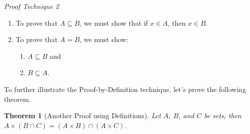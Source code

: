\documentclass[10pt,]{book}
\theoremstyle{plain}
\newtheorem{theorem}{Theorem}[section]
\theoremstyle{definition}
\theoremstyle{definition}
\theoremstyle{definition}
\begin{document}
\par
\emph{Proof Technique 2}%
\par
\leavevmode%
\begin{enumerate}[label=\arabic*]
\item\hypertarget{li-1}{}To prove that \(A\subseteq B\), we must show that if \(x \in  A\), then \(x \in  B\).%
\item\hypertarget{li-2}{}To prove that \(A = B\), we must show:%
\par
%
\begin{enumerate}[label=\alph*]
\item\hypertarget{li-3}{} \(A\subseteq B\) and%
\item\hypertarget{li-4}{} \(B \subseteq A\).%
\end{enumerate}
%
\end{enumerate}
%
\par
To further illustrate the Proof-by-Definition technique, let's prove the following theorem.%
\begin{theorem}[Another Proof using Definitions]\label{th-set-proof-example2}
Let \(A\), \(B\), and \(C\) be sets, then \(A \times  (B \cap  C) = (A \times  B) \cap  (A \times  C)\).%
\end{theorem}
\end{document}
